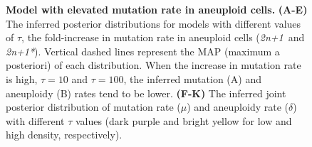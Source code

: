 \documentclass[12pt]{extarticle}
\newcommand{\anwt}{\emph{2n+1}}
\newcommand{\anmt}{\emph{2n+1*}}
\begin{document}
\begin{figure}[p]
\begin{subfigure}{0.325\textwidth}
  \end{subfigure}
  \caption{
    \textbf{Model with elevated mutation rate in aneuploid cells.}  \textbf{(A-E)} The inferred posterior distributions for models with different values of $\tau$, the fold-increase in mutation rate in aneuploid cells (\anwt\ and \anmt). Vertical dashed lines represent the MAP (maximum a posteriori) of each distribution. When the increase in mutation rate is high, $\tau=10$ and $\tau=100$, the inferred mutation (A) and aneuploidy (B) rates tend to be lower. 
    \textbf{(F-K)} The inferred joint posterior distribution of mutation rate ($\mu$) and aneuploidy rate ($\delta$) with different $\tau$ values (dark purple and bright yellow for low and high density, respectively).
  \label{fig:tau}
  }
  \end{figure}
  
  
  
\end{document}
